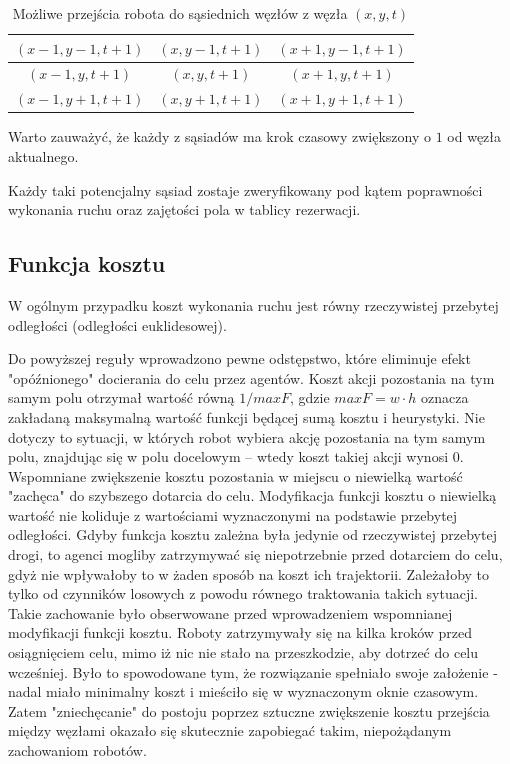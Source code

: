 \begin{table}[H]
\caption{Możliwe przejścia robota do sąsiednich węzłów z węzła $(x, y, t)$} \label{tab:node-neighbours} 
\centering
\begin{tabular}{| c | c | c |}
\hline
$(x-1, y-1, t+1)$ & $(x, y-1, t+1)$ & $(x+1, y-1, t+1)$ \\ \hline
$(x-1, y, t+1)$   & $(x, y, t+1)$   & $(x+1, y, t+1)$   \\ \hline
$(x-1, y+1, t+1)$ & $(x, y+1, t+1)$ & $(x+1, y+1, t+1)$ \\ \hline
\end{tabular}
\end{table}
Warto zauważyć, że każdy z sąsiadów ma krok czasowy zwiększony o $1$ od węzła aktualnego.

Każdy taki potencjalny sąsiad zostaje zweryfikowany pod kątem poprawności wykonania ruchu oraz zajętości pola w tablicy rezerwacji.

\subsection{Funkcja kosztu}
W ogólnym przypadku koszt wykonania ruchu jest równy rzeczywistej przebytej odległości (odległości euklidesowej).

Do powyższej reguły wprowadzono pewne odstępstwo, które eliminuje efekt "opóźnionego" docierania do celu przez agentów.
Koszt akcji pozostania na tym samym polu otrzymał wartość równą $1 / maxF$, gdzie $maxF = w \cdot h$ oznacza zakładaną maksymalną wartość funkcji będącej sumą kosztu i heurystyki.
Nie dotyczy to sytuacji, w których robot wybiera akcję pozostania na tym samym polu, znajdując się w polu docelowym -- wtedy koszt takiej akcji wynosi 0.
Wspomniane zwiększenie kosztu pozostania w miejscu o niewielką wartość "zachęca" do szybszego dotarcia do celu.
Modyfikacja funkcji kosztu o niewielką wartość nie koliduje z wartościami wyznaczonymi na podstawie przebytej odległości.
Gdyby funkcja kosztu zależna była jedynie od rzeczywistej przebytej drogi, to agenci mogliby zatrzymywać się niepotrzebnie przed dotarciem do celu, gdyż nie wpływałoby to w żaden sposób na koszt ich trajektorii. Zależałoby to tylko od czynników losowych z powodu równego traktowania takich sytuacji.
Takie zachowanie było obserwowane przed wprowadzeniem wspomnianej modyfikacji funkcji kosztu.
Roboty zatrzymywały się na kilka kroków przed osiągnięciem celu, mimo iż nic nie stało na przeszkodzie, aby dotrzeć do celu wcześniej. Było to spowodowane tym, że rozwiązanie spełniało swoje założenie - nadal miało minimalny koszt i mieściło się w wyznaczonym oknie czasowym.
Zatem "zniechęcanie" do postoju poprzez sztuczne zwiększenie kosztu przejścia między węzłami okazało się skutecznie zapobiegać takim, niepożądanym zachowaniom robotów.

